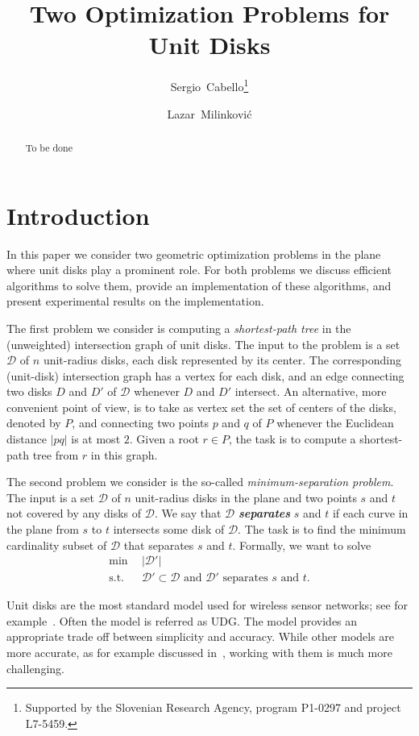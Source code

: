 \documentclass[a4paper,USenglish,numberwithinsect]{lipics}
\title{Two Optimization Problems for Unit Disks}
\author[1]{Sergio~Cabello\footnote{Supported by the Slovenian Research Agency, program P1-0297 and project L7-5459.}}
\author[2]{Lazar~Milinkovi\'c}
\affil[1]{FMF, University of Ljubljana, and 
	Institute of Mathematics, Physics and Mechanics, Slovenia}
\affil[2]{FMF and FRI, University of Ljubljana, Slovenia}
\newcommand{\D}{\ensuremath{\mathcal{D}}}
\def\DEF#1{\textbf{\emph{#1}}}
\begin{document}
\maketitle

\begin{abstract}
	To be done
\end{abstract}

\section{Introduction}

In this paper we consider two geometric optimization problems in the plane
where unit disks play a prominent role. For both problems 
we discuss efficient algorithms to solve them, provide an implementation
of these algorithms, and present experimental results on the implementation.

The first problem we consider is computing a \emph{shortest-path tree} 
in the (unweighted) intersection graph of unit disks. 
The input to the problem is a set $\D$ of $n$ unit-radius disks, each disk
represented by its center.
The corresponding (unit-disk) intersection graph has a vertex for each disk,
and an edge connecting two disks $D$ and $D'$ of $\D$ whenever $D$ and $D'$ intersect.
An alternative, more convenient point of view, is to take as vertex set the set of
centers of the disks, denoted by $P$, and connecting two points $p$ and $q$ of $P$ 
whenever the Euclidean distance $|pq|$ is at most $2$. 
Given a root $r\in P$, the task is to compute a shortest-path tree from $r$ in this graph.

The second problem we consider is the so-called \emph{minimum-separation problem}.
The input is a set $\D$ of $n$ unit-radius disks in the plane and two points
$s$ and $t$ not covered by any disks of $\D$.
We say that $\D$ \DEF{separates} $s$ and $t$ if each curve in the plane 
from $s$ to $t$ intersects some disk of $\D$.
The task is to find the minimum cardinality subset of $\D$
that separates $s$ and $t$. Formally, we want to solve
\begin{align*}
	\min ~~		& |\D'|\\
	 \mbox{s.t.}~~ & \D'\subset \D \text{ and $\D'$ separates $s$ and $t$}. 
\end{align*}

Unit disks are the most standard model used for wireless sensor networks; 
see for example~\cite{GG11,HS95,zg-wsn-04}. Often the model is referred as UDG.
The model provides an appropriate trade off between simplicity and accuracy. 
While other models are more accurate, as for example discussed in~\cite{KWZ03,LP10},
working with them is much more challenging.
\end{document}
